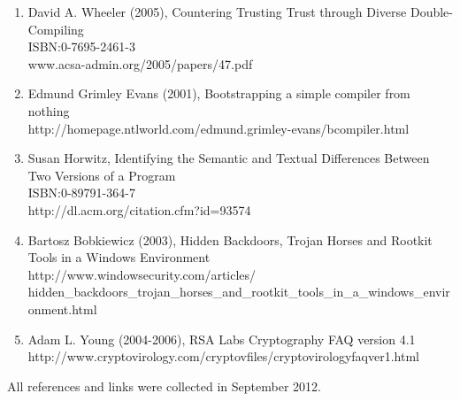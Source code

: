 \documentclass[a4paper, 12pt]{article}
\begin{document}
\begin{enumerate}
\item{David A. Wheeler (2005), Countering Trusting Trust through Diverse Double-Compiling\\ISBN:0-7695-2461-3\\www.acsa-admin.org/2005/papers/47.pdf}
\item{Edmund Grimley Evans (2001), Bootstrapping a simple compiler from nothing\\http://homepage.ntlworld.com/edmund.grimley-evans/bcompiler.html}
\item{Susan Horwitz, Identifying the Semantic and Textual Differences
Between Two Versions of a Program\\ISBN:0-89791-364-7\\http://dl.acm.org/citation.cfm?id=93574}
\item{Bartosz Bobkiewicz (2003), Hidden Backdoors, Trojan Horses and Rootkit Tools in a Windows Environment\\http://www.windowsecurity.com/articles/\\hidden\_backdoors\_trojan\_horses\_and\_rootkit\_tools\_in\_a\_windows\_environment.html}
\item{Adam L. Young (2004-2006), RSA Labs Cryptography FAQ version 4.1\\http://www.cryptovirology.com/cryptovfiles/cryptovirologyfaqver1.html}

\end{enumerate}

All references and links were collected in September 2012.

\end{document}
